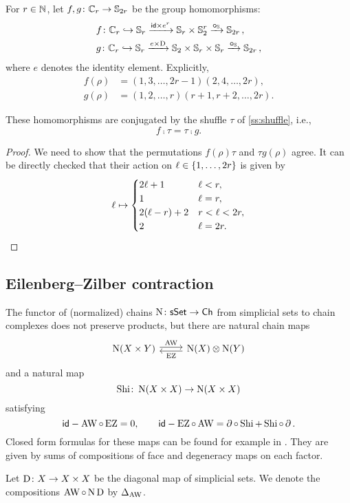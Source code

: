 For $r \in \mathbb{N}$, let $f,g \colon \mathbb{C}_r \to \mathbb{S}_{2r}$ be the group homomorphisms:
\[
\begin{split}
	&f \colon \mathbb{C}_r \hookrightarrow \mathbb{S}_r \xrightarrow{\mathsf{id} \times e^r} \mathbb{S}_r \times \mathbb{S}_2^r \xrightarrow{\bm{\mathbin{\circ}}_{\mathbb{S}}} \mathbb{S}_{2r}\,, \\
	&g \colon \mathbb{C}_r \hookrightarrow \mathbb{S}_r \xrightarrow{e \times \mathrm{D}} \mathbb{S}_2 \times \mathbb{S}_r \times \mathbb{S}_r \xrightarrow{\bm{\mathbin{\circ}}_{\mathbb{S}}} \mathbb{S}_{2r}\,,
\end{split}
\]
where $e$ denotes the identity element.
Explicitly,
\begin{align*}
	f(\rho) &= (1,3,\dots,2r-1)(2,4,\dots,2r), \\
	g(\rho) &= (1,2,\dots,r)(r+1,r+2,\dots,2r).
\end{align*}

\begin{lemma}\label{l:conjugated}
	These homomorphisms are conjugated by the shuffle $\tau$ of {\rm \cref{ss:shuffle}}, i.e.,
	\[
	f \comp \tau = \tau \comp g.
	\]
\end{lemma}

\begin{proof}
	We need to show that the permutations $f(\rho) \tau$ and $\tau g(\rho)$ agree.
	It can be directly checked that their action on $\ell \in \{1,\dots,2r\}$ is given by
	\[
	\ell \mapsto
	\begin{cases}
		2\ell+1 & \ell<r,\\
		1 & \ell = r,\\
		2(\ell-r)+2 & r < \ell <2r,\\
		2 & \ell = 2r. \qedhere
	\end{cases}
	\]
\end{proof}

\subsection{Eilenberg--Zilber contraction}

The functor of (normalized) chains $\operatorname{N} \colon \mathsf{sSet} \to \mathsf{Ch}$ from simplicial sets to chain complexes does not preserve products, but there are natural chain maps
\[
\begin{tikzcd}
	\chains(X \times Y) \arrow[r,shift left=2pt,"\AW"] &
	\chains(X) \ot \chains(Y) \arrow[l,shift left=2pt,"\EZ"]
\end{tikzcd}
\]
and a natural map
\[
\operatorname{Shi} \colon \operatorname{N}(X \times X) \to \operatorname{N}(X \times X)
\]
satisfying
\[
\mathsf{id} - \operatorname{AW} \mathbin{\circ} \operatorname{EZ} = 0, \qquad
\mathsf{id} - \operatorname{EZ} \mathbin{\circ} \operatorname{AW} = \operatorname{\partial} \mathbin{\circ} \operatorname{Shi} + \operatorname{Shi} \mathbin{\circ} \operatorname{\partial}.
\]
Closed form formulas for these maps can be found for example in \cite[56]{real2000homological}.
They are given by sums of compositions of face and degeneracy maps on each factor.

Let $\mathrm{D} \colon X \to X \times X$ be the diagonal map of simplicial sets.
We denote the compositions $\operatorname{AW} \mathbin{\circ} \operatorname{N}\mathrm{D}$ by $\Delta_{\operatorname{AW}}$.